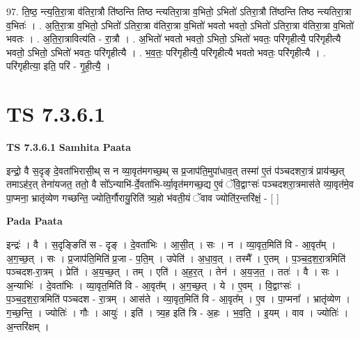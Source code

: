 \documentclass[17pt]{extarticle}
\begin{document}
97. ति॒ष्ठ॒ न्त्य॒ति॒रा॒त्रा व॑तिरा॒त्रौ ति॑ष्ठन्ति तिष्ठ न्त्यतिरा॒त्रा व॒भितो॒ ऽभितो॑ ऽतिरा॒त्रौ ति॑ष्ठन्ति तिष्ठ न्त्यतिरा॒त्रा व॒भितः॑ । . अ॒ति॒रा॒त्रा व॒भितो॒ ऽभितो॑ ऽतिरा॒त्रा व॑तिरा॒त्रा व॒भितो॑ भवतो भवतो॒ ऽभितो॑ ऽतिरा॒त्रा व॑तिरा॒त्रा व॒भितो॑ भवतः । . अ॒ति॒रा॒त्रावित्य॑ति - रा॒त्रौ । . अ॒भितो॑ भवतो भवतो॒ ऽभितो॒ ऽभितो॑ भवतः॒ परि॑गृहीत्यै॒ परि॑गृहीत्यै भवतो॒ ऽभितो॒ ऽभितो॑ भवतः॒ परि॑गृहीत्यै । . भ॒व॒तः॒ परि॑गृहीत्यै॒ परि॑गृहीत्यै भवतो भवतः॒ परि॑गृहीत्यै । . परि॑गृहीत्या॒ इति॒ परि॑ - गृ॒ही॒त्यै॒ । \newline
\pagebreak
{}

\section{ TS 7.3.6.1 }

\textbf{TS 7.3.6.1 } \newline
\textbf{Samhita Paata} \newline

इन्द्रो॒ वै स॒दृङ् दे॒वता॑भिरासी॒थ् स न व्या॒वृत॑मगच्छ॒थ् स प्र॒जाप॑ति॒मुपा॑धाव॒त् तस्मा॑ ए॒तं प॑ञ्चदशरा॒त्रं प्राय॑च्छ॒त् तमाऽह॑र॒त् तेना॑यजत॒ ततो॒ वै सो᳚ऽन्याभि॑-र्दे॒वता॑भि-र्व्या॒वृत॑मगच्छ॒द्य ए॒वं ॅवि॒द्वाꣳसः॑ पञ्चदशरा॒त्रमास॑ते व्या॒वृत॑मे॒व पा॒प्मना॒ भ्रातृ॑व्येण गच्छन्ति॒ ज्योति॒र्गौरायु॒रिति॑ त्र्य॒हो भ॑वती॒यं ॅवाव ज्योति॑र॒न्तरि॑क्षं॒ - [  ] \newline

\textbf{Pada Paata} \newline

इन्द्रः॑ । वै । स॒दृङ्ङिति॑ स - दृङ् । दे॒वता॑भिः । आ॒सी॒त् । सः । न । व्या॒वृत॒मिति॑ वि - आ॒वृत᳚म् । अ॒ग॒च्छ॒त् । सः । प्र॒जाप॑ति॒मिति॑ प्र॒जा - प॒ति॒म् । उपेति॑ । अ॒धा॒व॒त् । तस्मै᳚ । ए॒तम् । प॒ञ्च॒द॒श॒रा॒त्रमिति॑ पञ्चदश-रा॒त्रम् । प्रेति॑ । अ॒य॒च्छ॒त् । तम् । एति॑ । अ॒ह॒र॒त् । तेन॑ । अ॒य॒ज॒त॒ । ततः॑ । वै । सः । अ॒न्याभिः॑ । दे॒वता॑भिः । व्या॒वृत॒मिति॑ वि - आ॒वृत᳚म् । अ॒ग॒च्छ॒त् । ये । ए॒वम् । वि॒द्वाꣳसः॑ । प॒ञ्च॒द॒श॒रा॒त्रमिति॑ पञ्चदश - रा॒त्रम् । आस॑ते । व्या॒वृत॒मिति॑ वि - आ॒वृत᳚म् । ए॒व । पा॒प्मना᳚ । भ्रातृ॑व्येण । ग॒च्छ॒न्ति॒ । ज्योतिः॑ । गौः । आयुः॑ । इति॑ । त्र्य॒ह इति॑ त्रि - अ॒हः । भ॒व॒ति॒ । इ॒यम् । वाव । ज्योतिः॑ । अ॒न्तरि॑क्षम् ।  \newline
\end{document}
